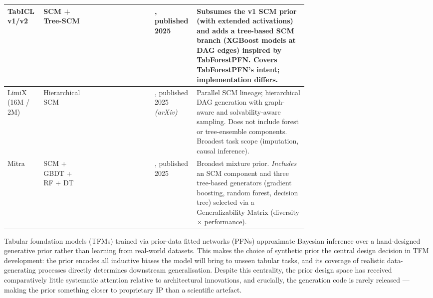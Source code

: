 \documentclass{article}
\newcommand{\cmark}{\ding{51}}
\newcommand{\xmark}{\ding{55}}
\begin{document}
\begin{table}[ht]
\begin{tabular}{p{0.12\linewidth}  p{0.07\linewidth} c c p{0.14\linewidth} p{0.375\linewidth}}

TabICL v1/v2
& SCM + Tree-SCM
& \cmark
& \cmark
& \citet{quTabICLTabularFoundation2025}, published 2025
& Subsumes the v1 SCM prior (with extended activations) and adds a tree-based SCM branch (XGBoost models at DAG edges) inspired by TabForestPFN. Covers TabForestPFN's intent; implementation differs. \\\midrule


LimiX (16M / 2M)
& Hierarchical SCM
& \xmark
& \xmark
& \citet{zhangLimiXUnleashingStructuredData2025}, published 2025 \textit{(arXiv)}
& Parallel SCM lineage; hierarchical DAG generation with graph-aware and solvability-aware sampling. Does not include forest or tree-ensemble components. Broadest task scope (imputation, causal inference). \\\midrule


Mitra
& SCM + GBDT + RF + DT
& \xmark
& \xmark
& \citet{zhangMitraMixedSynthetic2025}, published 2025
& Broadest mixture prior. \emph{Includes} an SCM component and three tree-based generators (gradient boosting, random forest, decision tree) selected via a Generalizability Matrix (diversity $\times$ performance). \\

\bottomrule
\end{tabular}
\end{table}

Tabular foundation models (TFMs) trained via prior-data fitted networks (PFNs) approximate Bayesian inference over a hand-designed generative prior rather than learning from real-world datasets.
This makes the choice of synthetic prior the central design decision in TFM development: the prior encodes all inductive biases the model will bring to unseen tabular tasks, and its coverage of realistic data-generating processes directly determines downstream generalisation. 
Despite this centrality, the prior design space has received comparatively little systematic attention relative to architectural innovations, and crucially, the generation code is rarely released — making the prior something closer to proprietary IP than a scientific artefact.
\end{document}
